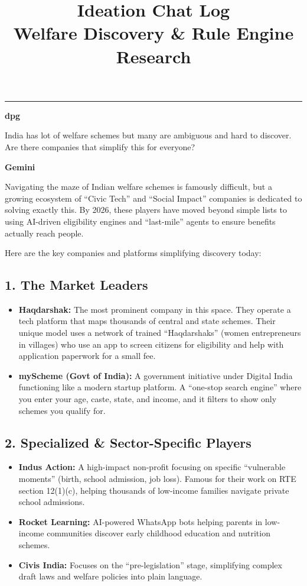 \documentclass[11pt,a4paper]{article}
\title{\color{primary}\textbf{Ideation Chat Log}\\[0.3em]
\large\color{secondary} Welfare Discovery \& Rule Engine Research}
\author{}
\date{}
\begin{document}
\maketitle
\thispagestyle{fancy}

\bigskip
\hrule
\bigskip


{\small\color{primary}\textbf{dpg}}
\begin{mebox}
India has lot of welfare schemes but many are ambiguous and hard to discover. Are there companies that simplify this for everyone?
\end{mebox}

{\small\color{secondary}\textbf{Gemini}}\vspace{2pt}

Navigating the maze of Indian welfare schemes is famously difficult, but a growing ecosystem of ``Civic Tech'' and ``Social Impact'' companies is dedicated to solving exactly this. By 2026, these players have moved beyond simple lists to using AI-driven eligibility engines and ``last-mile'' agents to ensure benefits actually reach people.

Here are the key companies and platforms simplifying discovery today:

\subsection*{1. The Market Leaders}
\begin{itemize}[nosep]
\item \textbf{Haqdarshak:} The most prominent company in this space. They operate a tech platform that maps thousands of central and state schemes. Their unique model uses a network of trained ``Haqdarshaks'' (women entrepreneurs in villages) who use an app to screen citizens for eligibility and help with application paperwork for a small fee.
\item \textbf{myScheme (Govt of India):} A government initiative under Digital India functioning like a modern startup platform. A ``one-stop search engine'' where you enter your age, caste, state, and income, and it filters to show only schemes you qualify for.
\end{itemize}

\subsection*{2. Specialized \& Sector-Specific Players}
\begin{itemize}[nosep]
\item \textbf{Indus Action:} A high-impact non-profit focusing on specific ``vulnerable moments'' (birth, school admission, job loss). Famous for their work on RTE section 12(1)(c), helping thousands of low-income families navigate private school admissions.
\item \textbf{Rocket Learning:} AI-powered WhatsApp bots helping parents in low-income communities discover early childhood education and nutrition schemes.
\item \textbf{Civis India:} Focuses on the ``pre-legislation'' stage, simplifying complex draft laws and welfare policies into plain language.
\end{itemize}
\end{document}
